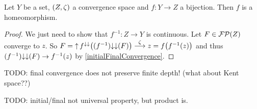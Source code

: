 \begin{lemma} \label{initialBijectionHomeomorphism}
Let $Y$ be a set, $\left( Z,\zeta \right)$ a convergence space and $f:Y\to Z$ a bijection. Then $f$ is a homeomorphism.
\end{lemma}
\begin{proof}
We just need to show that $f^{-1}: Z\to Y$ is continuous. Let $F\in \operatorname{\mathcal{FP}}(Z)$ converge to $z$. So $F = \operatorname{\uparrow} f^{\downarrow\downarrow}\big((f^{-1}){\downarrow\downarrow}(F)\big) \overset{\zeta}{\longrightarrow} z = f\big(f^{-1}(z)\big)$ and thus $(f^{-1}){\downarrow\downarrow}(F) \to f^{-1}(z)$ by \ref{initialFinalConvergence}.
\end{proof}


TODO: final convergence does not preserve finite depth! (what about Kent space??)

TODO: initial/final not universal property, but product is.

